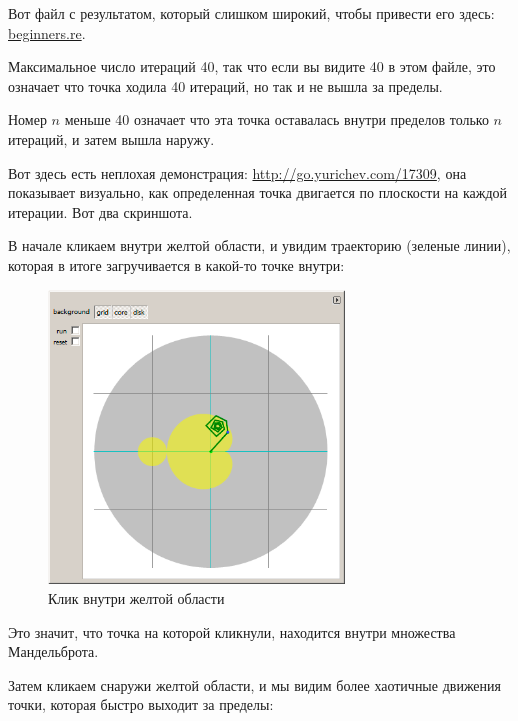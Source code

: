 

Вот файл с результатом, который слишком широкий, чтобы привести его здесь: \\
\href{http://go.yurichev.com/17164}{beginners.re}.

Максимальное число итераций 40, так что если вы видите 40 в этом файле, это означает что точка ходила
40 итераций, но так и не вышла за пределы.
 
Номер $n$ меньше 40 означает что эта точка оставалась внутри пределов только $n$ итераций, и затем
вышла наружу.


\clearpage
Вот здесь есть неплохая демонстрация: 
\url{http://go.yurichev.com/17309}, она показывает визуально,
как определенная точка двигается по плоскости на каждой итерации. 
Вот два скриншота.

В начале кликаем внутри желтой области, и увидим траекторию (зеленые линии), которая в итоге
загручивается в какой-то точке внутри:%


\begin{figure}[H]
\centering
\includegraphics[width=0.7\textwidth]{examples/demos/mandelbrot/demo1.png}
\caption{Клик внутри желтой области}
\end{figure}

Это значит, что точка на которой кликнули, находится внутри множества Мандельброта.


\clearpage
Затем кликаем снаружи желтой области, и мы видим более хаотичные движения точки, которая быстро выходит
за пределы:


